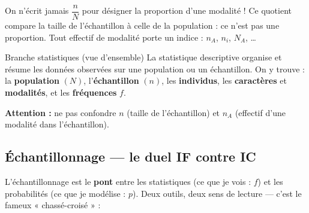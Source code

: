 \documentclass[11pt,a4paper]{article}
\begin{document}
	\begin{tcolorbox}[colback=white, colframe=spOrange!90!black, boxrule=0.9pt,
		arc=2mm, left=3mm, right=3mm, top=2mm, bottom=2mm,
		title={\sffamily\bfseries À retenir}, fonttitle=\bfseries,
		coltitle=white, colbacktitle=spOrange!85!black]
		On n'écrit jamais $\dfrac{n}{N}$ pour désigner la proportion d'une modalité !
		Ce quotient compare la taille de l'échantillon à celle de la population : ce
		n'est pas une proportion. Tout effectif de modalité porte un indice :
		$n_A$, $n_i$, $N_A$, \ldots
	\end{tcolorbox}
	
	\begin{fiche}{Branche statistiques (vue d'ensemble)}
		La statistique descriptive organise et résume les données observées sur une
		population ou un échantillon. On y trouve : la \textbf{population} $\left(N\right)$,
		l'\textbf{échantillon} $\left(n\right)$, les \textbf{individus}, les
		\textbf{caractères} et \textbf{modalités}, et les \textbf{fréquences} $f$.
		\begin{notebox}
			\textbf{Attention :} ne pas confondre $n$ (taille de l'échantillon) et $n_A$
			(effectif d'une modalité dans l'échantillon).
		\end{notebox}
	\end{fiche}
	
	\subsection{Échantillonnage — le duel IF contre IC}
	\label{sec:echantillonnage}
	
	L'échantillonnage est le \textbf{pont} entre les statistiques (ce que je vois :
	$f$) et les probabilités (ce que je modélise : $p$). Deux outils, deux sens de
	lecture — c'est le fameux « chassé-croisé » :
	
\end{document}
